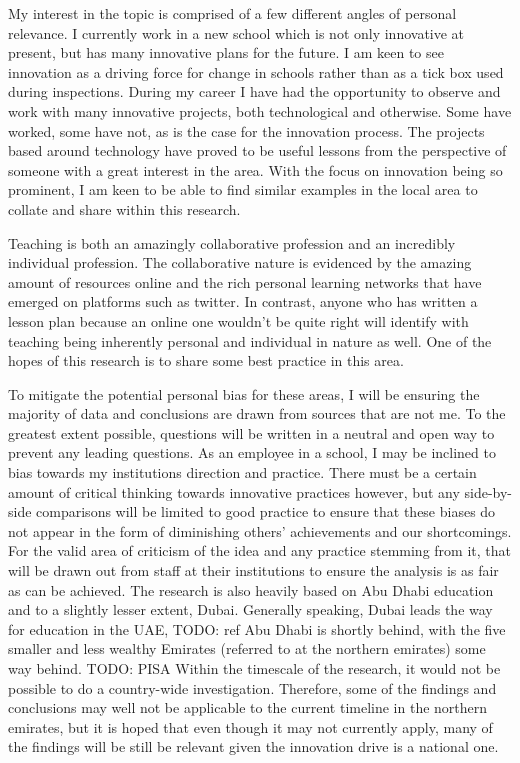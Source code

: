 My interest in the topic is comprised of a few different angles of personal relevance. I currently work in a new school which is not only innovative at present, but has many innovative plans for the future. I am keen to see innovation as a driving force for change in schools rather than as a tick box used during inspections. During my career I have had the opportunity to observe and work with many innovative projects, both technological and otherwise. Some have worked, some have not, as is the case for the innovation process. The projects based around technology have proved to be useful lessons from the perspective of someone with a great interest in the area. With the focus on innovation being so prominent, I am keen to be able to find similar examples in the local area to collate and share within this research.

Teaching is both an amazingly collaborative profession and an incredibly individual profession. The collaborative nature is evidenced by the amazing amount of resources online and the rich personal learning networks that have emerged on platforms such as twitter. In contrast, anyone who has written a lesson plan because an online one wouldn't be quite right will identify with teaching being inherently personal and individual  in nature as well. One of the hopes of this research is to share some best practice in this area.

To mitigate the potential personal bias for these areas, I will be ensuring the majority of data and conclusions are drawn from sources that are not me. To the greatest extent possible, questions will be written in a neutral and open way to prevent any leading questions.
As an employee in a school, I may be inclined to bias towards my institutions direction and practice. There must be a certain amount of critical thinking towards innovative practices however, but any side-by-side comparisons will be limited to good practice to ensure that these biases do not appear in the form of diminishing others’ achievements and our shortcomings. For the valid area of criticism of the idea and any practice stemming from it, that will be drawn out from staff at their institutions to ensure the analysis is as fair as can be achieved.
The research is also heavily based on Abu Dhabi education and to a slightly lesser extent, Dubai. Generally speaking, Dubai leads the way for education in the UAE, TODO: ref Abu Dhabi is shortly behind, with the five smaller and less wealthy Emirates (referred to at the northern emirates) some way behind. TODO: PISA Within the timescale of the research, it would not be possible to do a country-wide investigation. Therefore, some of the findings and conclusions may well not be applicable to the current timeline in the northern emirates, but it is hoped that even though it may not currently apply, many of the findings will be still be relevant given the innovation drive is a national one.


